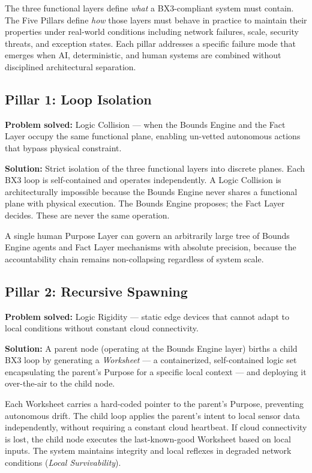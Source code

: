 \documentclass[12pt]{article}
\theoremstyle{plain}
\begin{document}
The three functional layers define \textit{what} a BX3-compliant system must contain. The Five Pillars define \textit{how} those layers must behave in practice to maintain their properties under real-world conditions including network failures, scale, security threats, and exception states. Each pillar addresses a specific failure mode that emerges when AI, deterministic, and human systems are combined without disciplined architectural separation.

\subsection{Pillar 1: Loop Isolation}

\textbf{Problem solved:} Logic Collision --- when the Bounds Engine and the Fact Layer occupy the same functional plane, enabling un-vetted autonomous actions that bypass physical constraint.

\textbf{Solution:} Strict isolation of the three functional layers into discrete planes. Each BX3 loop is self-contained and operates independently. A Logic Collision is architecturally impossible because the Bounds Engine never shares a functional plane with physical execution. The Bounds Engine proposes; the Fact Layer decides. These are never the same operation.

A single human Purpose Layer can govern an arbitrarily large tree of Bounds Engine agents and Fact Layer mechanisms with absolute precision, because the accountability chain remains non-collapsing regardless of system scale.

\subsection{Pillar 2: Recursive Spawning}

\textbf{Problem solved:} Logic Rigidity --- static edge devices that cannot adapt to local conditions without constant cloud connectivity.

\textbf{Solution:} A parent node (operating at the Bounds Engine layer) births a child BX3 loop by generating a \textit{Worksheet} --- a containerized, self-contained logic set encapsulating the parent's Purpose for a specific local context --- and deploying it over-the-air to the child node.

Each Worksheet carries a hard-coded pointer to the parent's Purpose, preventing autonomous drift. The child loop applies the parent's intent to local sensor data independently, without requiring a constant cloud heartbeat. If cloud connectivity is lost, the child node executes the last-known-good Worksheet based on local inputs. The system maintains integrity and local reflexes in degraded network conditions (\textit{Local Survivability}).
\end{document}
